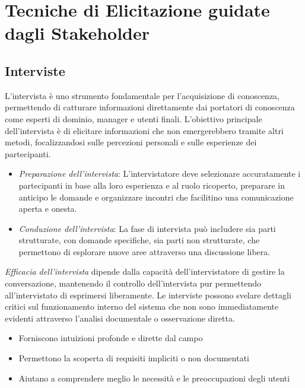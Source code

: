 \section{Tecniche di Elicitazione guidate dagli Stakeholder}
\subsection{Interviste}

L'intervista è uno strumento fondamentale per l'acquisizione di conoscenza, permettendo
di catturare informazioni direttamente dai portatori di conoscenza come esperti di
dominio, manager e utenti finali. L'obiettivo principale dell'intervista è di elicitare
informazioni che non emergerebbero tramite altri metodi, focalizzandosi sulle percezioni
personali e sulle esperienze dei partecipanti.

\begin{itemize}
    \item \textit{Preparazione dell'intervista}: L'intervistatore deve selezionare
    accuratamente i partecipanti in base alla loro esperienza e al ruolo ricoperto,
    preparare in anticipo le domande e organizzare incontri che facilitino una
    comunicazione aperta e onesta.
    \item \textit{Conduzione dell'intervista}: La fase di intervista può includere
    sia parti strutturate, con domande specifiche, sia parti non strutturate, che
    permettono di esplorare nuove aree attraverso una discussione libera.
\end{itemize}

\textit{Efficacia dell'intervista} dipende dalla capacità dell'intervistatore di
gestire la conversazione, mantenendo il controllo dell'intervista pur permettendo
all'intervistato di esprimersi liberamente. Le interviste possono svelare dettagli
critici sul funzionamento interno del sistema che non sono immediatamente evidenti
attraverso l'analisi documentale o osservazione diretta.

\begin{tcolorbox}[colback=green!5!white,colframe=green!75!black, title=Pro delle interviste]
    \begin{itemize}
        \item Forniscono intuizioni profonde e dirette dal campo
        \item Permettono la scoperta di requisiti impliciti o non documentati
        \item Aiutano a comprendere meglio le necessità e le preoccupazioni degli utenti
    \end{itemize}
\end{tcolorbox}

